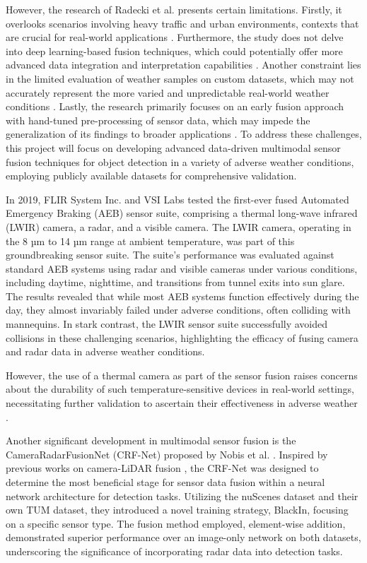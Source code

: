 \documentclass[report.tex]{subfiles}
\begin{document}
    However, the research of Radecki et al. \cite{radecki2016all} presents certain limitations. Firstly, it overlooks scenarios involving heavy traffic and urban environments, contexts that are crucial for real-world applications \cite{cai2020probabilistic}. Furthermore, the study does not delve into deep learning-based fusion techniques, which could potentially offer more advanced data integration and interpretation capabilities \cite{diaby2021evidential}. Another constraint lies in the limited evaluation of weather samples on custom datasets, which may not accurately represent the more varied and unpredictable real-world weather conditions \cite{galvao2021pedestrian}. Lastly, the research primarily focuses on an early fusion approach with hand-tuned pre-processing of sensor data, which may impede the generalization of its findings to broader applications \cite{rizzoli2022multimodal}. To address these challenges, this project will focus on developing advanced data-driven multimodal sensor fusion techniques for object detection in a variety of adverse weather conditions, employing publicly available datasets for comprehensive validation.

    In 2019, FLIR System Inc. \cite{fused_aeb} and VSI Labs \cite{VSILabs} tested the first-ever fused Automated Emergency Braking (AEB) sensor suite, comprising a thermal long-wave infrared (LWIR) camera, a radar, and a visible camera. The LWIR camera, operating in the 8 µm to 14 µm range at ambient temperature, was part of this groundbreaking sensor suite. The suite's performance was evaluated against standard AEB systems using radar and visible cameras under various conditions, including daytime, nighttime, and transitions from tunnel exits into sun glare. The results revealed that while most AEB systems function effectively during the day, they almost invariably failed under adverse conditions, often colliding with mannequins. In stark contrast, the LWIR sensor suite successfully avoided collisions in these challenging scenarios, highlighting the efficacy of fusing camera and radar data in adverse weather conditions.

    However, the use of a thermal camera as part of the sensor fusion raises concerns about the durability of such temperature-sensitive devices in real-world settings, necessitating further validation to ascertain their effectiveness in adverse weather \cite{zang2019impact}.

    Another significant development in multimodal sensor fusion is the CameraRadarFusionNet (CRF-Net) proposed by Nobis et al. \cite{nobis2019deep}. Inspired by previous works on camera-LiDAR fusion \cite{yu2019multi, caltagirone2019lidar}, the CRF-Net was designed to determine the most beneficial stage for sensor data fusion within a neural network architecture for detection tasks. Utilizing the nuScenes \cite{caesar2020nuscenes} dataset and their own TUM dataset, they introduced a novel training strategy, BlackIn, focusing on a specific sensor type. The fusion method employed, element-wise addition, demonstrated superior performance over an image-only network on both datasets, underscoring the significance of incorporating radar data into detection tasks.
\end{document}
